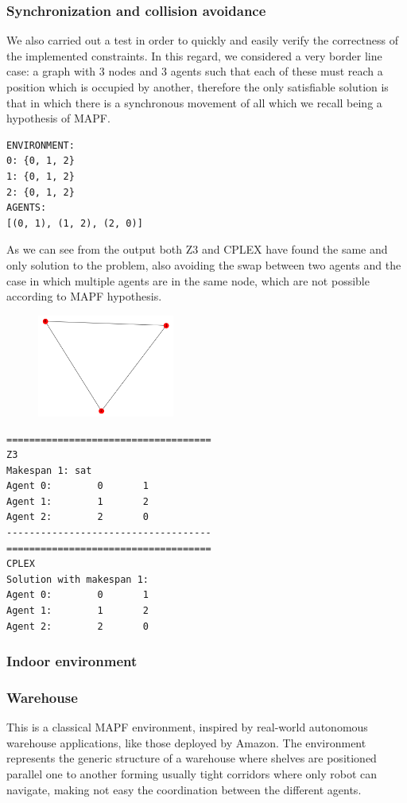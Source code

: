 \documentclass[12pt, a4paper, hidelinks]{article}
\numberwithin{equation}{section}
\begin{document}
\subsubsection{Synchronization and collision avoidance}
We also carried out a test in order to quickly and easily verify the correctness of the implemented constraints.
In this regard, we considered a very border line case: a graph with 3 nodes and 3 agents such that each of these must reach a position which is occupied by another, therefore the only satisfiable solution is that in which there is a synchronous movement of all which we recall being a hypothesis of MAPF\@.

\begin{lstlisting}[label={lst:synchronized}]
ENVIRONMENT:
0: {0, 1, 2}
1: {0, 1, 2}
2: {0, 1, 2}
AGENTS:
[(0, 1), (1, 2), (2, 0)]
\end{lstlisting}
As we can see from the output both Z3 and CPLEX have found the same and only solution to the problem,
also avoiding the swap between two agents and the case in which multiple agents are in the same node,
which are not possible according to MAPF hypothesis.
\begin{figure}
    \centering
    \includegraphics[width=0.4\textwidth]{synchronous_movement_graph.png}
\end{figure}
\begin{lstlisting}[label={lst:test}]
====================================
Z3
Makespan 1: sat
Agent 0:        0       1
Agent 1:        1       2
Agent 2:        2       0
------------------------------------
====================================
CPLEX
Solution with makespan 1:
Agent 0:        0       1
Agent 1:        1       2
Agent 2:        2       0
\end{lstlisting}
    
\subsubsection{Indoor environment}
\subsubsection{Warehouse}
This is a classical MAPF environment, inspired by real-world autonomous warehouse applications, like those deployed by Amazon.
The environment represents the generic structure of a warehouse where shelves are positioned parallel one to another forming usually tight corridors where only robot can navigate, making not easy the coordination between the different agents.
\end{document}
